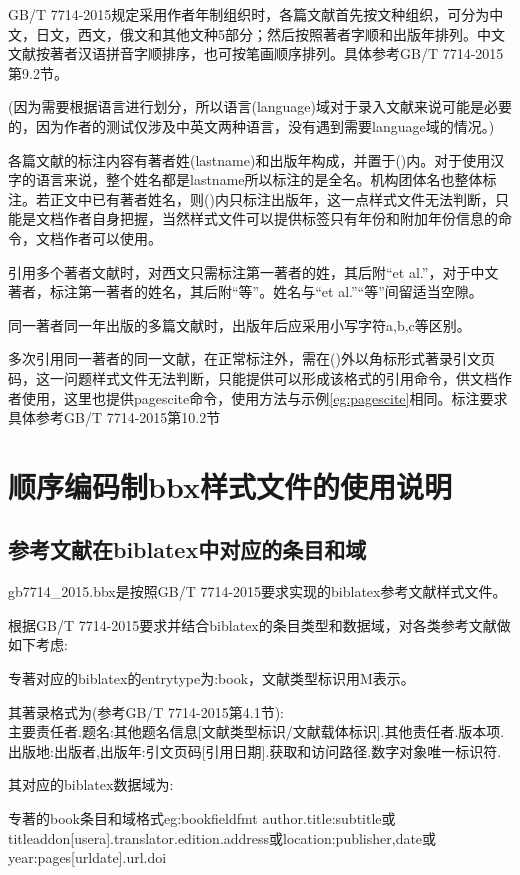 \documentclass[11pt]{article} %
\begin{document}
GB/T 7714-2015规定采用作者年制组织时，各篇文献首先按文种组织，可分为中文，日文，西文，俄文和其他文种5部分；然后按照著者字顺和出版年排列。中文文献按著者汉语拼音字顺排序，也可按笔画顺序排列。具体参考GB/T 7714-2015第9.2节。

(因为需要根据语言进行划分，所以语言(language)域对于录入文献来说可能是必要的，因为作者的测试仅涉及中英文两种语言，没有遇到需要language域的情况。)

各篇文献的标注内容有著者姓(lastname)和出版年构成，并置于()内。对于使用汉字的语言来说，整个姓名都是lastname所以标注的是全名。机构团体名也整体标注。若正文中已有著者姓名，则()内只标注出版年，这一点样式文件无法判断，只能是文档作者自身把握，当然样式文件可以提供标签只有年份和附加年份信息的命令，文档作者可以使用。

引用多个著者文献时，对西文只需标注第一著者的姓，其后附“et al.”，对于中文著者，标注第一著者的姓名，其后附“等”。姓名与“et al.”“等”间留适当空隙。

同一著者同一年出版的多篇文献时，出版年后应采用小写字符a,b,c等区别。

多次引用同一著者的同一文献，在正常标注外，需在()外以角标形式著录引文页码，这一问题样式文件无法判断，只能提供可以形成该格式的引用命令，供文档作者使用，这里也提供pagescite命令，使用方法与示例\ref{eg:pagescite}相同。标注要求具体参考GB/T 7714-2015第10.2节


\section{顺序编码制bbx样式文件的使用说明}

\subsection{参考文献在biblatex中对应的条目和域}\label{sec:numeric:data}
gb7714\_2015.bbx是按照GB/T 7714-2015要求实现的biblatex参考文献样式文件。

根据GB/T 7714-2015要求并结合biblatex的条目类型和数据域，对各类参考文献做如下考虑:
\begin{refentry}{}{}
专著对应的biblatex的entrytype为:book，文献类型标识用M表示。

其著录格式为(参考GB/T 7714-2015第4.1节):\\
主要责任者.题名:其他题名信息[文献类型标识/文献载体标识].其他责任者.版本项.出版地:出版者,出版年:引文页码[引用日期].获取和访问路径.数字对象唯一标识符.
\end{refentry}

其对应的biblatex数据域为:
\begin{codetex}{专著的book条目和域格式}{eg:bookfieldfmt}
author.title:subtitle或titleaddon[usera].translator.edition.address或location:publisher,date或year:pages[urldate].url.doi
\end{codetex}
\end{document}
